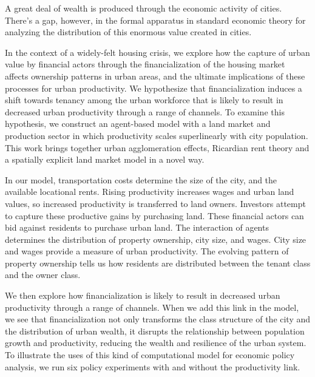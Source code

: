 



A great deal of wealth is produced through the economic activity of cities. There's a gap, however, in the formal apparatus in standard economic theory for analyzing the distribution of this enormous value created in cities. 

In the context of a widely-felt housing crisis, we explore how the capture of urban value by financial actors through the financialization of the housing market affects ownership patterns in urban areas, and the ultimate implications of these processes for urban productivity.  We hypothesize that financialization induces a shift towards tenancy among the urban workforce that is likely to result in decreased urban productivity through a range of channels. To examine this hypothesis, we construct an agent-based model with a land market and production sector in which productivity scales superlinearly with city population. This work brings together urban agglomeration effects, Ricardian rent theory and a spatially explicit land market model in a novel way. 

In our model, transportation costs determine the size of the city, and the available locational rents. Rising productivity increases wages and urban land values, so increased productivity is transferred to land owners. Investors attempt to capture these productive gains by purchasing land. These financial actors can bid against residents to purchase urban land. The interaction of agents determines the distribution of property ownership,  city size, and wages. City size and wages provide a measure of urban productivity. The evolving pattern of property ownership tells us how residents are distributed between the tenant class and the owner class. 

We then explore how financialization is likely to result in decreased urban productivity through a range of channels. When we add this link in the model, we see that financialization not only transforms the class structure of the city and the distribution of urban wealth, it disrupts the relationship between population growth and productivity, reducing the wealth and resilience of the urban system. To illustrate the uses of this kind of computational model for economic policy analysis, we run six policy experiments with and without the productivity link.  

